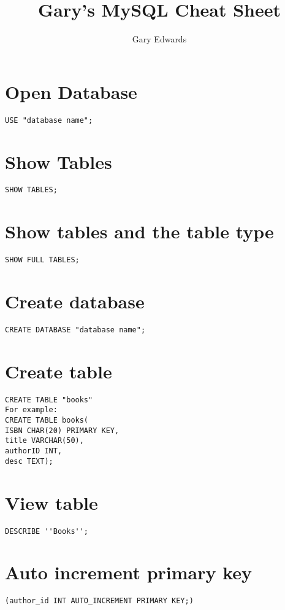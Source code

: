 \documentclass{article}
\author{Gary Edwards}
\title{Gary's MySQL Cheat Sheet}
\begin{document}
\maketitle

\newpage

\section{Open Database}

\verb|USE "database name";|

\section{Show Tables}

\verb|SHOW TABLES;|

\section{Show tables and the table type}

\verb|SHOW FULL TABLES;|

\section{Create database}

\verb|CREATE DATABASE "database name";|

\section{Create table}

\verb|CREATE TABLE "books"|\\

\verb|For example:|\\
\verb|CREATE TABLE books(|\\
\verb|ISBN CHAR(20) PRIMARY KEY,|\\
\verb|title VARCHAR(50),|\\
\verb|authorID INT,|\\
\verb|desc TEXT);|

\section{View table}
\verb|DESCRIBE ''Books'';|

\section{Auto increment primary key}
\verb|(author_id INT AUTO_INCREMENT PRIMARY KEY;)|
\end{document}
